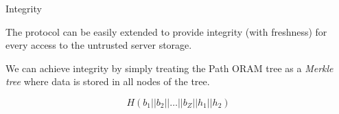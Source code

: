 	\begin{frame}{Integrity}
		
		The protocol can be easily extended to provide integrity (with freshness) for every access to the untrusted server storage.

		We can achieve integrity by simply treating the Path ORAM tree as a \emph{Merkle tree} where data is stored in all nodes of the tree.

		\[
			H (b_1 || b_2 || \ldots || b_Z || h_1 || h_2 )
		\]

	\end{frame}
